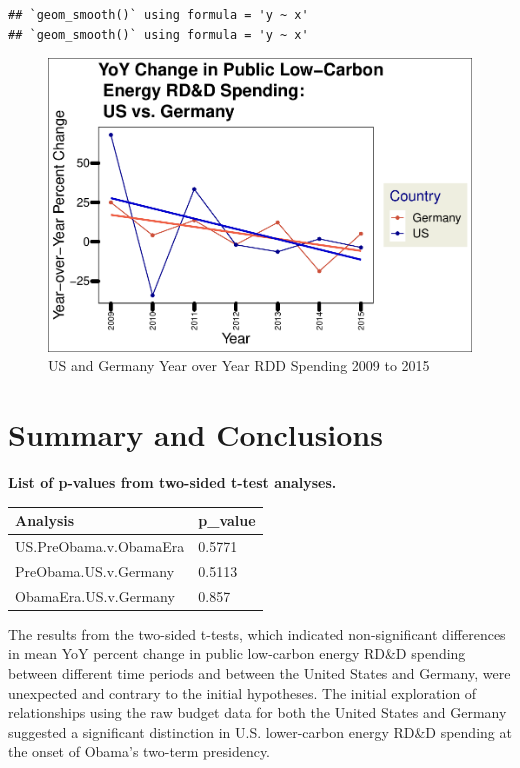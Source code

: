 \documentclass[
  12pt,
]{article}
\begin{document}
\begin{verbatim}
## `geom_smooth()` using formula = 'y ~ x'
## `geom_smooth()` using formula = 'y ~ x'
\end{verbatim}

\begin{figure}
\centering
\includegraphics{Chang_Jenkins_Mullens_ENV872_Final_files/figure-latex/visualizing Obama US and Germany data together-1.pdf}
\caption{US and Germany Year over Year RDD Spending 2009 to 2015}
\end{figure}

\newpage

\hypertarget{summary-and-conclusions}{%
\section{Summary and Conclusions}\label{summary-and-conclusions}}

\textbf{List of p-values from two-sided t-test analyses.}

\begin{longtable}[]{@{}ll@{}}
\toprule()
Analysis & p\_value \\
\midrule()
\endhead
US.PreObama.v.ObamaEra & 0.5771 \\
PreObama.US.v.Germany & 0.5113 \\
ObamaEra.US.v.Germany & 0.857 \\
\bottomrule()
\end{longtable}

The results from the two-sided t-tests, which indicated non-significant
differences in mean YoY percent change in public low-carbon energy RD\&D
spending between different time periods and between the United States
and Germany, were unexpected and contrary to the initial hypotheses. The
initial exploration of relationships using the raw budget data for both
the United States and Germany suggested a significant distinction in
U.S. lower-carbon energy RD\&D spending at the onset of Obama's two-term
presidency.
\end{document}
